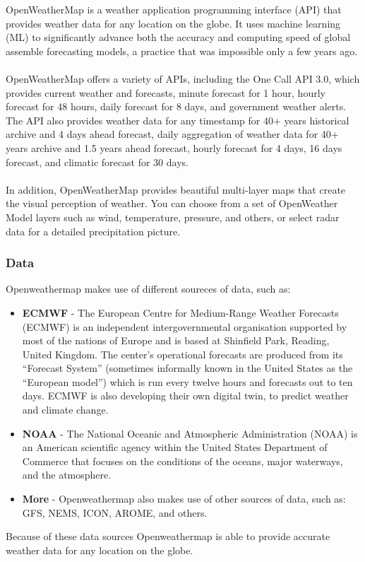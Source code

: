 \documentclass[../paper.tex]{subfiles}
\begin{document}
    OpenWeatherMap is a weather application programming interface (API) that provides weather data for any location on the globe.
    It uses machine learning (ML) to significantly advance both the accuracy and computing speed of global assemble forecasting models, a practice that was impossible only a few years ago\cite{b1}.
    \\\\
    OpenWeatherMap offers a variety of APIs, including the One Call API 3.0, which provides current weather and forecasts, minute forecast for 1 hour, hourly forecast for 48 hours, daily forecast for 8 days, and government weather alerts\cite{b1}.
    The API also provides weather data for any timestamp for 40+ years historical archive and 4 days ahead forecast, daily aggregation of weather data for 40+ years archive and 1.5 years ahead forecast, hourly forecast for 4 days, 16 days forecast, and climatic forecast for 30 days\cite{b1}.
    \\\\
    In addition, OpenWeatherMap provides beautiful multi-layer maps that create the visual perception of weather.
    You can choose from a set of OpenWeather Model layers such as wind, temperature, pressure, and others, or select radar data for a detailed precipitation picture\cite{b1}.

    \subsubsection{Data}
    Openweathermap makes use of different soureces of data, such as:
    \begin{itemize}
        \item \textbf{ECMWF} - The European Centre for Medium-Range Weather Forecasts (ECMWF) is an independent intergovernmental organisation supported by most of the nations of Europe and is based at Shinfield Park, Reading, United Kingdom.
         The center's operational forecasts are produced from its ``Forecast System'' (sometimes informally known in the United States as the ``European model'') which is run every twelve hours and forecasts out to ten days\cite{b4}.
         ECMWF is also developing their own digital twin, to predict weather and climate change\cite{b5}.
        \item \textbf{NOAA} - The National Oceanic and Atmospheric Administration (NOAA) is an American scientific agency within the United States Department of Commerce that focuses on the conditions of the oceans, major waterways, and the atmosphere\cite{b6}.
        \item \textbf{More} - Openweathermap also makes use of other sources of data, such as: GFS, NEMS, ICON, AROME, and others\cite{b2}.
    \end{itemize}
    Because of these data sources Openweathermap is able to provide accurate weather data for any location on the globe.
\end{document}
